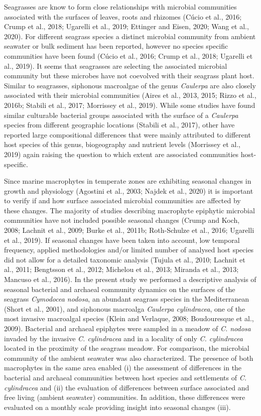 \documentclass[
  12pt,
]{article}
\begin{document}
Seagrasses are know to form close relationships with microbial
communities associated with the surfaces of leaves, roots and rhizomes
(Cúcio et al., 2016; Crump et al., 2018; Ugarelli et al., 2019; Ettinger
and Eisen, 2020; Wang et al., 2020). For different seagrass species a
distinct microbial community from ambient seawater or bulk sediment has
been reported, however no species specific communities have been found
(Cúcio et al., 2016; Crump et al., 2018; Ugarelli et al., 2019). It
seems that seagrasses are selecting the associated microbial community
but these microbes have not coevolved with their seagrass plant host.
Similar to seagrasses, siphonous macroalgae of the genus \emph{Caulerpa}
are also closely associated with their microbial communities (Aires et
al., 2013, 2015; Rizzo et al., 2016b; Stabili et al., 2017; Morrissey et
al., 2019). While some studies have found similar culturable bacterial
groups associated with the surface of a \emph{Caulerpa} species from
different geographic locations (Stabili et al., 2017), other have
reported large compositional differences that were mainly attributed to
different host species of this genus, biogeography and nutrient levels
(Morrissey et al., 2019) again raising the question to which extent are
associated communities host-specific.

Since marine macrophytes in temperate zones are exhibiting seasonal
changes in growth and physiology (Agostini et al., 2003; Najdek et al.,
2020) it is important to verify if and how surface associated microbial
communities are affected by these changes. The majority of studies
describing macrophyte epiphytic microbial communities have not included
possible seasonal changes (Crump and Koch, 2008; Lachnit et al., 2009;
Burke et al., 2011b; Roth-Schulze et al., 2016; Ugarelli et al., 2019).
If seasonal changes have been taken into account, low temporal
frequency, applied methodologies and/or limited number of analysed host
species did not allow for a detailed taxonomic analysis (Tujula et al.,
2010; Lachnit et al., 2011; Bengtsson et al., 2012; Michelou et al.,
2013; Miranda et al., 2013; Mancuso et al., 2016). In the present study
we performed a descriptive analysis of seasonal bacterial and archaeal
community dynamics on the surfaces of the seagrass \emph{Cymodocea
nodosa}, an abundant seagrass species in the Mediterranean (Short et
al., 2001), and siphonous macroalga \emph{Caulerpa cylindracea}, one of
the most invasive macroalgal species (Klein and Verlaque, 2008;
Boudouresque et al., 2009). Bacterial and archaeal epiphytes were
sampled in a meadow of \emph{C. nodosa} invaded by the invasive \emph{C.
cylindracea} and in a locality of only \emph{C. cylindracea} located in
the proximity of the seagrass meadow. For comparison, the microbial
community of the ambient seawater was also characterized. The presence
of both macrophytes in the same area enabled (i) the assessment of
differences in the bacterial and archaeal communities between host
species and settlements of \emph{C. cylindracea} and (ii) the evaluation
of differences between surface associated and free living (ambient
seawater) communities. In addition, these differences were evaluated on
a monthly scale providing insight into seasonal changes (iii).
\end{document}
